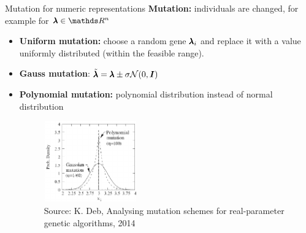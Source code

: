 \begin{frame}[containsverbatim]{Mutation for numeric representations}
  \textbf{Mutation:} individuals are changed, for example for $\xx \in \R^n$
  \begin{itemize}
  \item \textbf{Uniform mutation:} choose a random gene $\pmb{\lambda}_{i}$ and replace it with a value uniformly distributed (within the feasible range).
  \item \textbf{Gauss mutation}: $\tilde{\pmb{\lambda}} = \pmb{\lambda} \pm \sigma \mathcal{N}(0, \boldsymbol{I})$
  \item \textbf{Polynomial mutation:} polynomial distribution instead of normal distribution
  \begin{center}
  \begin{figure}
    \includegraphics[height = 3.5cm, width = 4cm]{images/polynomial_mutation.png}\\
    \scriptsize{Source: K. Deb, Analysing mutation schemes for real-parameter genetic algorithms, 2014}
  \end{figure}
   \end{center}
  \end{itemize}

  \end{frame}

